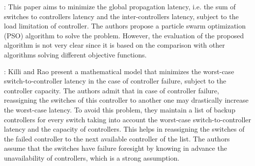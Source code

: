 \documentclass[a4paper,10pt]{article}
\begin{document}




\cite{GaWa15}: This paper aims to minimize the global propagation latency, i.e. the sum of switches to controllers latency and the inter-controllers latency, subject to the load limitation of controller. The authors propose a particle swarm optimization (PSO) algorithm to solve the problem. However, the evaluation of the proposed algorithm is not very clear since it is based on the comparison with other algorithms solving different objective functions. 





\cite{KiRa16}: Killi and Rao present a mathematical model that minimizes the worst-case switch-to-controller latency in the case of controller failure, subject to the controller capacity. The authors admit that in case of controller failure, reassigning the switches of this controller to another one may drastically increase the worst-case latency. To avoid this problem, they maintain a list of backup controllers for every switch taking into account the worst-case switch-to-controller latency and the capacity of controllers. This helps in reassigning the switches of the failed controller to the next available controller of the list. The authors assume that the switches have failure foresight by knowing in advance the unavailability of controllers, which is a strong assumption.  
\end{document}

